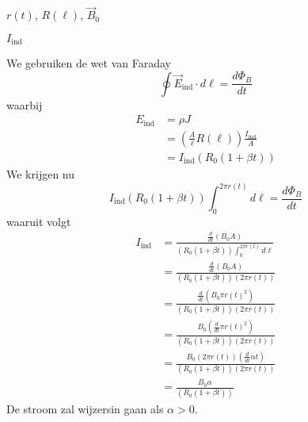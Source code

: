 \begin{description}[labelwidth=1.5cm, leftmargin=!]
    \item[Geg. :]  $r(t)$, $R(\ell)$, $\Vec{B}_0$
    \item[Gevr. :]  $I_{\text{ind}}$
    \item[Opl. :] 
        We gebruiken de wet van Faraday
        \begin{equation*}
            \oint \Vec{E}_{\text{ind}} \cdot d\ell = \frac{d\Phi_B}{dt} 
        \end{equation*}
        waarbij
        \begin{align*}
            E_{\text{ind}} 
                &= \rho J \\
                &= \left(\frac{A}{\ell}R(\ell)\right)\frac{I_{\text{ind}}}{A} \\ 
                &= I_{\text{ind}}\left(R_{0}(1 + \beta t)\right)
        \end{align*} 
        We krijgen nu
        \begin{equation*}
                I_{\text{ind}}\left(R_{0}(1 + \beta t)\right) \int_0^{2\pi r(t)} d\ell = \frac{d\Phi_B}{dt}
        \end{equation*}
        waaruit volgt
        \begin{align*}
            I_{\text{ind}} 
                &= \frac{\frac{d}{dt} \left( B_0 A \right)}{\left(R_{0}(1 + \beta t)\right) \int_0^{2\pi r(t)} d\ell } \\
                &= \frac{\frac{d}{dt} \left( B_0 A \right)}{\left(R_{0}(1 + \beta t)\right) \left(2\pi r(t)\right) } \\
                &= \frac{\frac{d}{dt} \left(B_0 \pi r(t)^2 \right)}{\left(R_{0}(1 + \beta t)\right) \left(2\pi r(t)\right)} \\
                &= \frac{B_0 \left(\frac{d}{dt} \pi r(t)^2\right)}{\left(R_{0}(1 + \beta t)\right)\left(2\pi r(t)\right)} \\
                &= \frac{B_0 \left(2\pi r(t)\right) \left(\frac{d}{dt} \alpha t\right)}{\left(R_{0}(1 + \beta t)\right)\left(2\pi r(t)\right)} \\
                &= \frac{B_0 \alpha}{\left(R_{0}(1 + \beta t)\right)}
        \end{align*}
        De stroom zal wijzersin gaan als $\alpha > 0$.
\end{description}

\vspace{1cm}